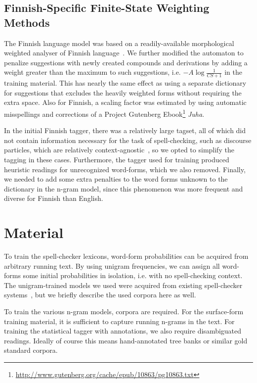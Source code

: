 \documentclass{llncs}
\begin{document}
\subsection{Finnish-Specific Finite-State Weighting Methods}

The Finnish language model was based on a readily-available morphological
weighted analyser of Finnish language~\cite{pirinen/2011/nodalida}.  We
further modified the automaton to penalize suggestions with newly created
compounds and derivations by adding a weight greater than the maximum to such suggestions, 
i.e. $-A\log\frac{1}{CS+1}$ in the training material. This has nearly the same effect as using a separate
dictionary for suggestions that excludes the heavily weighted forms without
requiring the extra space.  Also for Finnish, a scaling factor was estimated by using automatic misspellings and corrections
of a Project Gutenberg Ebook\footnote{\url{http://www.gutenberg.org/cache/epub/10863/pg10863.txt}} \emph{Juha}.

In the initial Finnish tagger, there was a relatively large tagset, all of
which did not contain information necessary for the task of
spell-checking, such as discourse particles, which are relatively
context-agnostic~\cite{visk}, so we opted to simplify the tagging in these
cases. Furthermore, the tagger used for training produced heuristic readings for
unrecognized word-forms, which we also removed. Finally, we needed to add
some extra penalties to the word forms unknown to the dictionary in the n-gram model,
since this phenomenon was more frequent and diverse for Finnish than English.

\section{Material}
\label{sec:material}

To train the spell-checker lexicons, word-form probabilities can be acquired
from arbitrary running text. By using unigram frequencies, we can assign
all word-forms some initial probabilities in isolation, i.e. with no spell-checking context.
The unigram-trained models we used were acquired from existing 
spell-checker systems~\cite{norvig/2010,pirinen/2010/lrec}, but we briefly
describe the used corpora here as well.

To train the various n-gram models, corpora are required. For the surface-form
training material, it is sufficient to capture running n-grams in the text.
For training the statistical tagger with annotations, we also require 
disambiguated readings. Ideally of course this means hand-annotated
tree banks or similar gold standard corpora. 
\end{document}

